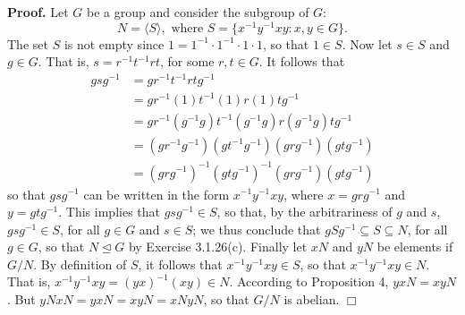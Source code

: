 \documentclass[9pt]{article}
\newcommand{\qed}{\hfill \ensuremath{\Box}}
\newcommand{\cyc}[1]{\langle #1 \rangle}
\begin{document}
\begin{enumerate}
      \textbf{Proof.} Let $G$ be a group and consider the subgroup of $G$:
      $$N = \cyc{S}, \text{ where } S = \{x^{-1}y^{-1}xy : x, y \in G\}.$$
      The set $S$ is not empty since $1 = 1^{-1}\cdot1^{-1}\cdot1\cdot1$, so
      that $1 \in S$. Now let $s \in S$ and $g \in G$. That is,
      $s = r^{-1}t^{-1}rt$, for some $r, t \in G$. It follows that
      \begin{align*}
         gsg^{-1} &= gr^{-1}t^{-1}rtg^{-1} \\
            &= gr^{-1}(1)t^{-1}(1)r(1)tg^{-1} \\
            &= gr^{-1}(g^{-1}g)t^{-1}(g^{-1}g)r(g^{-1}g)tg^{-1} \\
            &= (gr^{-1}g^{-1})(gt^{-1}g^{-1})(grg^{-1})(gtg^{-1}) \\
            &= (grg^{-1})^{-1}(gtg^{-1})^{-1}(grg^{-1})(gtg^{-1})
      \end{align*}
      so that $gsg^{-1}$ can be written in the form $x^{-1}y^{-1}xy$, where
      $x = grg^{-1}$ and $y = gtg^{-1}$. This implies that $gsg^{-1} \in S$, so
      that, by the arbitrariness of $g$ and $s$, $gsg^{-1} \in S$, for all
      $g \in G$ and $s \in S$; we thus conclude that
      $gSg^{-1} \subseteq S \subseteq N$, for all $g \in G$, so that $N 
      \trianglelefteq G$ by Exercise 3.1.26(c). Finally let $xN$ and $yN$ be
      elements if $G/N$. By definition of $S$, it follows that
      $x^{-1}y^{-1}xy \in S$, so that $x^{-1}y^{-1}xy \in N$. That is,
      $x^{-1}y^{-1}xy = (yx)^{-1}(xy) \in N$. According to Proposition 4,
      $yxN = xyN$. But $yNxN = yxN = xyN = xNyN$, so that $G/N$ is abelian.
      \qed
\end{enumerate}
\end{document}
